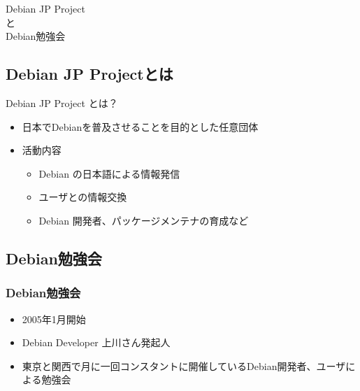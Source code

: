 \begin{frame}
  \begin{center}\Huge{Debian JP Project\\と\\Debian勉強会}\end{center}
\end{frame}

\subsection{Debian JP Projectとは}
  
\begin{frame}{Debian JP Project とは？}

\begin{itemize}
  \item 日本でDebianを普及させることを目的とした任意団体
  \item 活動内容
  \begin{itemize}
    \item Debian の日本語による情報発信
    \item ユーザとの情報交換
    \item Debian 開発者、パッケージメンテナの育成など
  \end{itemize}
\end{itemize}

\end{frame}

\subsection{Debian勉強会}

\begin{frame}
  
\frametitle{Debian勉強会}
\begin{itemize}
 \item 2005年1月開始
 \item Debian Developer 上川さん発起人
\item 東京と関西で月に一回コンスタントに開催しているDebian開発者、ユーザによる勉強会
\end{itemize}

\end{frame}


